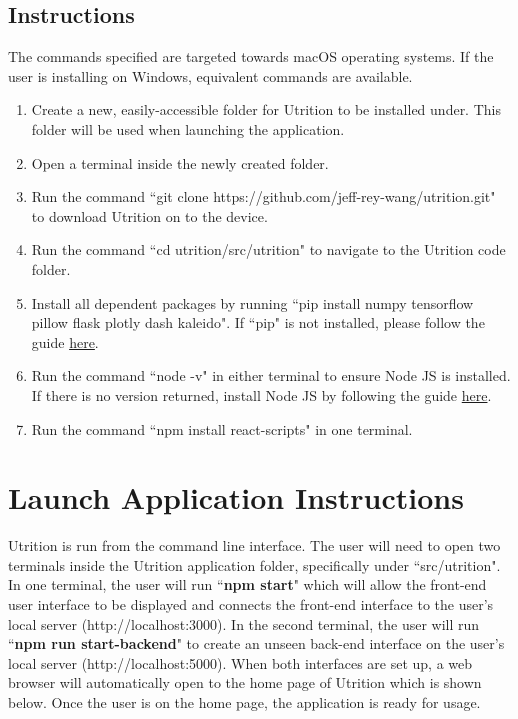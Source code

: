 \documentclass{article}
\begin{document}
\subsection{Instructions}
The commands specified are targeted towards macOS operating systems. If the user is installing on Windows, equivalent commands are available.

\begin{enumerate}
	\item Create a new, easily-accessible folder for Utrition to be installed under. This folder will be used when launching the application.
	\item Open a terminal inside the newly created folder.
	\item Run the command ``git clone https://github.com/jeff-rey-wang/utrition.git" to download Utrition on to the device.
	\item Run the command ``cd utrition/src/utrition" to navigate to the Utrition code folder.
	\item Install all dependent packages by running ``pip install numpy tensorflow pillow flask plotly dash kaleido".
	\subitem If ``pip" is not installed, please follow the guide \href{https://pip.pypa.io/en/stable/installation/}{here}.
	\item Run the command ``node -v" in either terminal to ensure Node JS is installed. If there is no version returned, install Node JS by following the guide \href{https://nodejs.org/en/download}{here}.
	\item Run the command ``npm install react-scripts" in one terminal.
\end{enumerate}

\section{Launch Application Instructions}
Utrition is run from the command line interface. The user will need to open two terminals inside the Utrition application folder, specifically under ``src/utrition". In one terminal, the user will run ``\textbf{npm start}" which will allow the front-end user interface to be displayed and connects the front-end interface to the user’s local server (http://localhost:3000). In the second terminal, the user will run ``\textbf{npm run start-backend}" to create an unseen back-end interface on the user’s local server (http://localhost:5000). When both interfaces are set up, a web browser will automatically open to the home page of Utrition which is shown below. Once the user is on the home page, the application is ready for usage.
\end{document}
